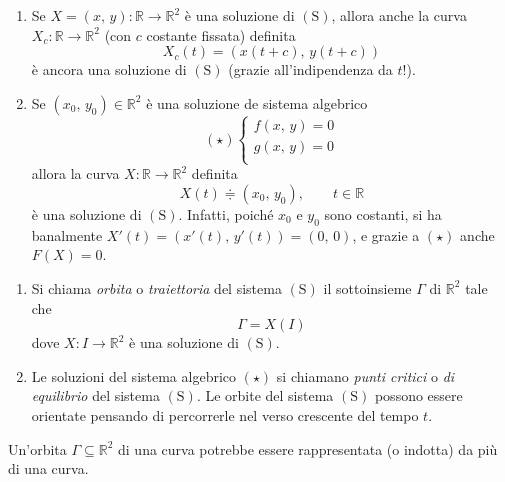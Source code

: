 \begin{obs}
\mbox{}
\begin{enumerate}[labelindent=\parindent,leftmargin=*,label=\textnormal{(\arabic*)},start=1]
\item Se $X = (x,\,y) : \mathbb{R} \longrightarrow \mathbb{R}^2$ è una soluzione di $\mathrm{(S)}$, allora anche la curva $X_{c} : \mathbb{R} \longrightarrow \mathbb{R}^2$ (con $c$ costante fissata) definita
$$
X_c(t) = \left( x(t+c),\,y(t+c) \right)
$$
è ancora una soluzione di $\mathrm{(S)}$ (grazie all'indipendenza da $t$!).
\item Se $(x_0,\,y_0) \in \mathbb{R}^2$ è una soluzione de sistema algebrico
$$
\mathrm{(\star)}
\begin{cases}
f(x,\,y) = 0\\
g(x,\,y) = 0\\
\end{cases}
$$
allora la curva $X : \mathbb{R} \longrightarrow \mathbb{R}^2$ definita
$$
X(t) \doteqdot (x_0,\,y_0), \qquad t \in \mathbb{R}
$$
è una soluzione di $\mathrm{(S)}$. Infatti, poiché $x_0$ e $y_0$ sono costanti, si ha banalmente $X'(t) = (x'(t),\,y'(t)) = (0,\,0)$, e grazie a $\mathrm{(\star)}$ anche $F(X) = 0$.
\end{enumerate}
\end{obs}


\begin{definition}
\mbox{}
\begin{enumerate}[labelindent=\parindent,leftmargin=*,label=\textnormal{(\roman*)},start=1]
\item Si chiama \emph{orbita} o \emph{traiettoria} del sistema $\mathrm{(S)}$ il sottoinsieme $\Gamma$ di $\mathbb{R}^2$ tale che
$$
\Gamma = X(I)
$$
dove $X : I \longrightarrow \mathbb{R}^2$ è una soluzione di $\mathrm{(S)}$.
\item Le soluzioni del sistema algebrico $\mathrm{(\star)}$ si chiamano \emph{punti critici} o \emph{di equilibrio} del sistema $\mathrm{(S)}$.
Le orbite del sistema $\mathrm{(S)}$ possono essere orientate pensando di percorrerle nel verso crescente del tempo $t$.
\end{enumerate}
\end{definition}

\begin{obs}
Un'orbita $\Gamma \subseteq \mathbb{R}^2$ di una curva potrebbe essere rappresentata (o indotta) da più di una curva.
\end{obs}

